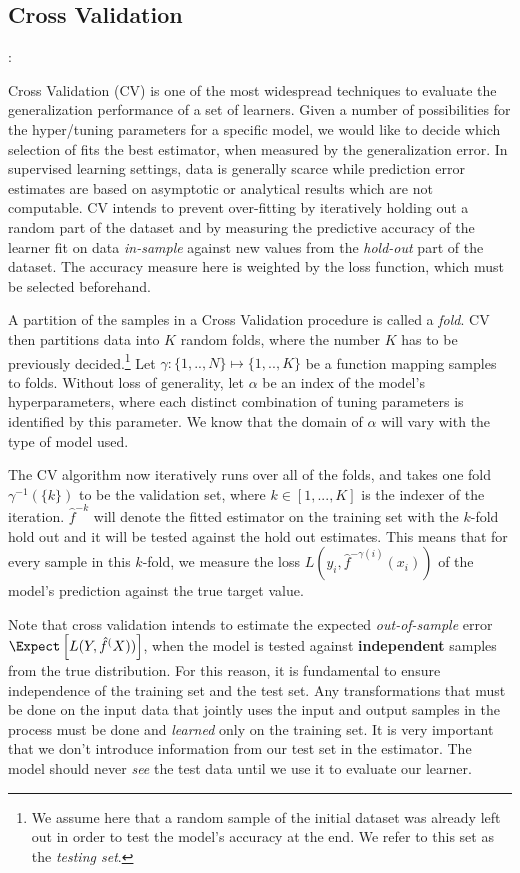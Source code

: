 \subsection{Cross Validation}:  

Cross Validation (CV) is one of the most widespread techniques to evaluate the generalization performance of a set of learners. Given a number of possibilities for the hyper/tuning parameters for a specific model, we would like to decide which selection of fits the best estimator, when measured by the generalization error. In supervised learning settings, data is generally scarce while prediction error estimates are based on asymptotic or analytical results which are not computable. CV intends to prevent over-fitting by iteratively holding out a random part of the dataset and by measuring the predictive accuracy of the learner fit on data \textit{in-sample} against new values from the \textit{hold-out} part of the dataset. The accuracy measure here is weighted by the loss function, which must be selected beforehand. 

A partition of the samples in a Cross Validation procedure is called a \textit{fold}. CV then partitions data into $K$ random folds, where the number $K$ has to be previously decided.\footnote{ We assume here that a random sample of the initial dataset was already left out in order to test the model's accuracy at the end. We refer to this set as the \textit{testing set}.} Let $\gamma : \{1,..,N\} \mapsto \{1, .., K\}$ be a function mapping samples to folds. Without loss of generality,  let $\alpha$ be an index of the model's hyperparameters, where each distinct combination of tuning parameters is identified by this parameter. We know that the domain of $\alpha$ will vary with the type of model used. 

The CV algorithm now iteratively runs over all of the folds, and takes one fold $\gamma^{-1}(\{k\})$ to be the validation set, where $k \in [1,...,K]$ is the indexer of the iteration. $\hat{f}^{-k}$ will denote the fitted estimator on the training set with the $k$-fold hold out and it will be tested against the hold out estimates. This means that for every sample in this $k$-fold, we measure the loss $L(y_i, \hat{f}^{-\gamma(i)}(x_i))$ of the model's prediction against the true target value.

Note that cross validation intends to estimate the expected \textit{out-of-sample} error $\Expect \left[  L(Y, \hat{f}^(X)) \right]$, when the model is tested against \textbf{independent} samples from the true distribution. For this reason, it is fundamental to ensure independence of the training set and the test set. Any transformations that must be done on the input data that jointly uses the input and output samples in the process must be done and \textit{learned} only on the training set. It is very important that we don't introduce information from our test set in the estimator. The model should never \textit{see} the test data until we use it to evaluate our learner. 


